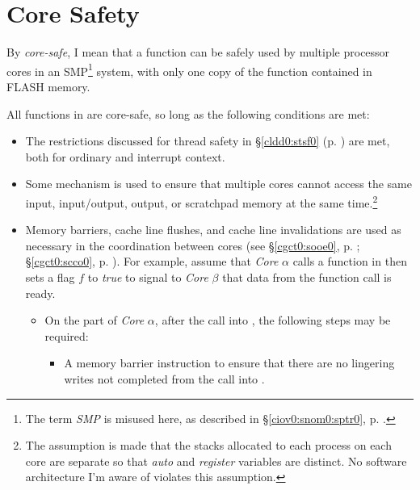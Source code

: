 \section{Core Safety}
\label{cldd0:scsf0}

By \emph{core-safe}, I mean that a function 
can be safely used by multiple processor cores in an 
SMP\footnote{The term \emph{SMP} is misused here, as 
described in \S{}\ref{ciov0:snom0:sptr0}, p.  
\pageref{ciov0:snom0:sptr0}.} system, with only one copy of 
the function contained in FLASH memory.  

All functions in \emph{\productbasenameshort{}} are core-safe,
so long as the following conditions are met:

\begin{itemize}
\item The restrictions discussed for thread safety in
      \S{}\ref{cldd0:stsf0} (p.  \pageref{cldd0:stsf0})
      are met, both for ordinary and interrupt context.
\item Some mechanism is used to ensure that multiple cores
      cannot access the same input, input/output, output, or 
      scratchpad memory at the same time.\footnote{The
      assumption is made that the stacks allocated to each
      process on each core are separate so that \emph{auto} 
      and \emph{register} variables are distinct.  No 
      software architecture I'm aware of violates this
      assumption.}
\item Memory barriers, cache line flushes, and cache line
      invalidations are used as necessary in the
      coordination between cores (see
      \S{}\ref{cgct0:sooe0}, p. \pageref{cgct0:sooe0};
      \S{}\ref{cgct0:scco0}, p. \pageref{cgct0:scco0}).
      For example, assume
      that \emph{Core} $\alpha$ calls a function in
      \emph{\productbasenameshort{}} then sets a flag
      $f$ to \emph{true} to
      signal to \emph{Core} $\beta$ that data from
      the function call is ready.
      \begin{itemize}
      \item On the part of \emph{Core} $\alpha$, after the
            call into \emph{\productbasenameshort{}}, the 
            following steps may be required:
            \begin{itemize}
            \item A memory barrier instruction to ensure
                  that there
                  are no lingering
                  writes not completed from the call into
                  \emph{\productbasenameshort{}}.

\end{itemize}
\end{itemize}
\end{itemize}
